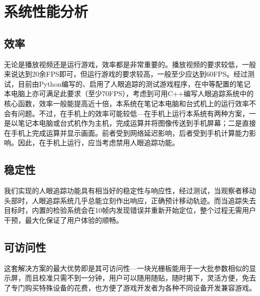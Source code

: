 \documentclass[12pt,a4paper]{article}
\begin{document}
\section{系统性能分析}

\subsection{效率}

无论是播放视频还是运行游戏，效率都是非常重要的。播放视频的要求较低，一般来说达到20余FPS即可，但运行游戏的要求较高，一般至少应达到60FPS。经过测试，目前由Python编写的、启用了人眼追踪的测试游戏程序，在中等配置的笔记本电脑上亦可满足此要求（至少70FPS），考虑到可用C++编写人眼追踪系统中的核心函数，效率一般能提高近十倍，本系统在笔记本电脑和台式机上的运行效率不会有问题。不过，在手机上的效率可能较低---在手机上运行本系统有两种方案，一是以笔记本电脑或台式机作为主机，完成运算并将图像传送到手机屏幕；二是直接在手机上完成运算并显示画面。前者受到网络延迟影响，后者受到手机计算能力影响。因此，在手机上运行，应当考虑禁用人眼追踪功能。

\subsection{稳定性}

我们实现的人眼追踪功能具有相当好的稳定性与响应性，经过测试，当观察者移动头部时，人眼追踪系统几乎总能立刻作出响应，正确预计移动轨迹。而当追踪失去目标时，内置的检验系统会在10帧内发现错误并重新开始定位，整个过程无需用户干预，最大化保证了用户体验的顺畅。

\subsection{可访问性}

这套解决方案的最大优势即是其可访问性---一块光栅板能用于一大批参数相似的显示屏，而且校准只需不到一分钟，用户可以随用随贴，随时揭下，灵活方便，免去了专门购买特殊设备的花费，也方便了游戏开发者为各种不同设备开发兼容游戏。
\end{document}
